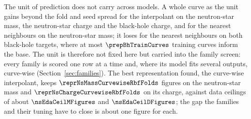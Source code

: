 The unit of prediction does not carry across models. A whole curve as the unit gains beyond the fold and seed spread for the interpolant on the neutron-star mass, the neutron-star charge and the black-hole charge, and for the nearest neighbours on the neutron-star mass; it loses for the nearest neighbours on both black-hole targets, where at most $\prepBhTrainCurves$ training curves inform the base. The unit is therefore not fixed here but carried into the family screen: every family is scored one row at a time and, where its model fits several outputs, curve-wise (Section~\ref{sec:families}). The best representation found, the curve-wise interpolant, keeps $\reprNsMassCurvewiseRbfFolds$ figures on the neutron-star mass and $\reprNsChargeCurvewiseRbfFolds$ on its charge, against data ceilings of about $\nsEdaCeilMFigures$ and $\nsEdaCeilDFigures$; the gap the families and their tuning have to close is about one figure for each.
